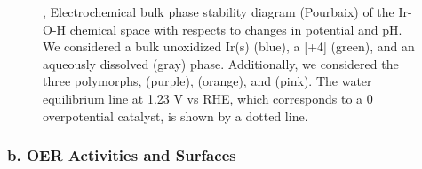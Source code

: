 \begin{figure}
\centering
{}
\caption{\label{fig:bulk_pourbaix},
Electrochemical bulk phase stability diagram (Pourbaix) of the Ir-O-H chemical space with respects to changes in potential and pH.
%
We considered a bulk unoxidized Ir(s) (blue), a [+4] \rIrOtwo  (green), and an aqueously dissolved  (gray) phase.
%
Additionally, we considered the three  polymorphs, \aIrOthree (purple), \rIrOthree (orange), and \bIrOthree (pink).
%
The water equilibrium line at 1.23 V vs RHE, which corresponds to a 0 overpotential catalyst, is shown by a dotted line.
}
\end{figure}



\subsubsection{b. OER Activities and Surfaces}

